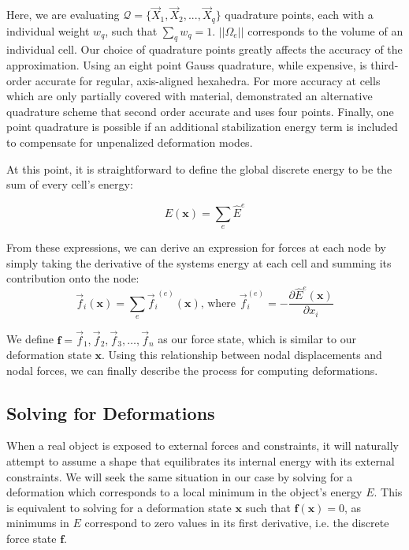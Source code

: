 Here, we are evaluating $\mathcal Q = \{\vec{X}_1,\vec{X}_2,...,\vec{X}_q\}$
quadrature points, each with a individual weight $w_q$, such that
$\sum_q w_q = 1$. $||\Omega_e||$ corresponds to the volume of an
individual cell. Our choice of quadrature points greatly affects the
accuracy of the approximation. Using an eight point Gauss quadrature,
while expensive, is third-order accurate for regular, axis-aligned hexahedra. For more
accuracy at cells which are only partially covered with material,
\cite{PatteMS:2012} demonstrated an alternative quadrature scheme that
second order accurate and uses four points. Finally, one point quadrature is possible
\citep{McAdaZSETTS:2011} if an additional stabilization energy term is
included to compensate for unpenalized deformation modes.

At this point, it is straightforward to define the global discrete
energy to be the sum of every cell's energy:

\begin{equation}
  E(\mathbf x) = \sum_e \hat{E}^{e} 
\end{equation}

From these expressions, we can derive an expression for forces at each
node by simply taking the derivative of the systems energy at each
cell and summing its contribution onto the node:
\begin{equation}
  \label{equ:discreteforces}
  \vec{f}_i(\mathbf x) = \sum_{e} \vec{f}_i^{\;(e)}(\mathbf x)
  \text{, where } \vec{f}_i^{(e)} = - \frac{\partial \hat{E}^{e}(\mathbf x)}{\partial x_i}
\end{equation}

We define $\mathbf f = {\vec{f}_1, \vec{f}_2, \vec{f}_3, \ldots, \vec{f}_n}$ as
our force state, which is similar to our deformation state $\mathbf x$.
Using this relationship between nodal displacements and nodal forces,
we can finally describe the process for computing deformations.


\subsection{Solving for Deformations}

When a real object is exposed to external forces and constraints, it
will naturally attempt to assume a shape that equilibrates its
internal energy with its external constraints. We will seek the same
situation in our case by solving for a deformation which corresponds
to a local minimum in the object's energy $E$. This is equivalent to
solving for a deformation state $\mathbf{x}$ such that
$\mathbf{f}(\mathbf{x}) = 0$, as minimums in $E$ correspond to zero
values in its first derivative, i.e. the discrete force state
$\mathbf{f}$.

